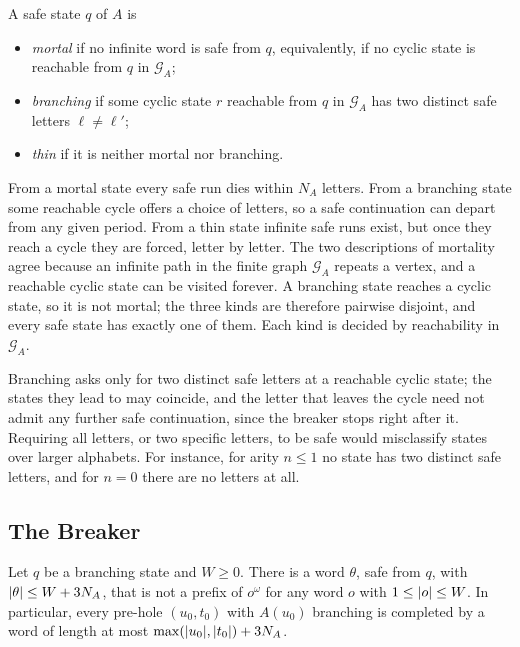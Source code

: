 \begin{definition}\label{def:nm-kinds}
A safe state $q$ of $A$ is
\begin{itemize}
\item \emph{mortal} if no infinite word is safe from $q$, equivalently, if no
cyclic state is reachable from $q$ in $\mathcal G_A$;
\item \emph{branching} if some cyclic state $r$ reachable from $q$ in
$\mathcal G_A$ has two distinct safe letters $\ell\ne\ell'$;
\item \emph{thin} if it is neither mortal nor branching.
\end{itemize}
\end{definition}

From a mortal state every safe run dies within $N_A$ letters. From a branching
state some reachable cycle offers a choice of letters, so a safe continuation
can depart from any given period. From a thin state infinite safe runs exist,
but once they reach a cycle they are forced, letter by letter. The two
descriptions of mortality agree because an infinite path in the finite graph
$\mathcal G_A$ repeats a vertex, and a reachable cyclic state can be visited
forever. A branching state reaches a cyclic state, so it is not mortal; the
three kinds are therefore pairwise disjoint, and every safe state has exactly
one of them. Each kind is decided by reachability in $\mathcal G_A$.

Branching asks only for two distinct safe letters at a reachable cyclic state;
the states they lead to may coincide, and the letter that leaves the cycle
need not admit any further safe continuation, since the breaker stops right
after it. Requiring all letters, or two specific letters, to be safe would
misclassify states over larger alphabets. For instance, for arity $n\le1$ no
state has two distinct safe letters, and for $n=0$ there are no letters at
all.

\subsection{The Breaker}\label{sec:nm-breaker}

\begin{lemma}[Breaker]\label{lem:nm-breaker}
Let $q$ be a branching state and $W\ge0$. There is a word $\theta$, safe from
$q$, with $\lvert \theta\rvert\le W+3N_A$, that is not a prefix of $o^\omega$ for any
word $o$ with $1\le\lvert o\rvert\le W$. In particular, every pre-hole $(u_0,t_0)$ with
$A(u_0)$ branching is completed by a word of length at most
$\max(\lvert u_0\rvert,\lvert t_0\rvert)+3N_A$.
\end{lemma}

